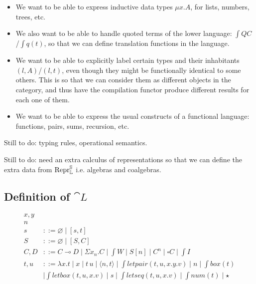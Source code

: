 \begin{itemize}
  \item We want to be able to express inductive data types $\mu x . A$, for lists,
        numbers, trees, etc.
  \item We also want to be able to handle quoted terms of the lower language: $\int{Q}
          C$/$\int{q}(t)$, so that we can define translation functions in the language.
  \item We want to be able to explicitly label certain types and their inhabitants $(l,
          A)$/$(l, t)$, even though they might be functionally identical to some others.
        This is so that we can consider them as different objects in the category, and
        thus have the compilation functor produce different results for each one of
        them.
  \item We want to be able to express the usual constructs of a functional language:
        functions, pairs, sums, recursion, etc.
\end{itemize}

Still to do: typing rules, operational semantics.

Still to do: need an extra calculus of representations so that we can define
the extra data from $\mathrm{Repr} _{\mathbb L} ^{\mathbb S}$ i.e. algebras and coalgebras.

\subsection{Definition of $\cat L$}

\begin{align*}
  x,y  \tag{variables}                                                                                                         \\
  n \tag{finite natural numbers, word size}                                                                                    \\
  s    & ::= \varnothing \mid [s, t] \tag{sequences}                                                                           \\
  S    & ::= \varnothing \mid [S, C] \tag{type sequences}                                                                      \\
  C, D & ::= C \multimap D \mid \Sigma x _{n} . C \mid \int{W} \mid S[n] \mid C ^n \mid \square C \mid \int{I} \tag{types}     \\
  t, u & ::= \lambda x . t \mid x \mid t\,u \mid \langle n, t \rangle \mid \int{letpair}(t, u, x.y.v) \mid n \mid \int{box}(t) \\
       & \mid \int{letbox}(t, u, x.v) \mid s \mid \int{letseq}(t, u, x.v) \mid \int{num}(t) \mid \star \tag{terms}
\end{align*}

